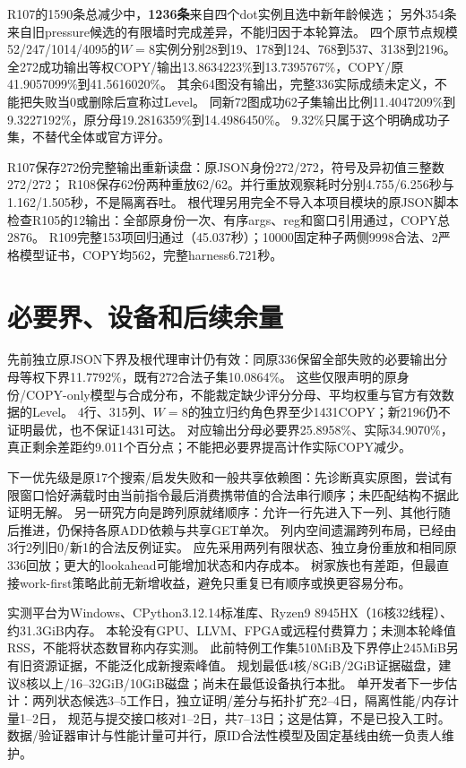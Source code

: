 \documentclass[UTF8,11pt,a4paper]{ctexart}
\begin{document}
R107的1590条总减少中，\textbf{1236条}来自四个dot实例且选中新年龄候选；
另外354条来自旧pressure候选的有限墙时完成差异，不能归因于本轮算法。
四个原节点规模52/247/1014/4095的$W=8$实例分别28到19、178到124、768到537、3138到2196。
全272成功输出等权COPY/输出13.8634223\%到13.7395767\%，COPY/原41.9057099\%到41.5616020\%。
其余64图没有输出，完整336实际成绩未定义，不能把失败当0或删除后宣称过Level。
同新72图成功62子集输出比例11.4047209\%到9.3227192\%，原分母19.2816359\%到14.4986450\%。
9.32\%只属于这个明确成功子集，不替代全体或官方评分。

R107保存272份完整输出重新读盘：原JSON身份272/272，符号及异初值三整数272/272；
R108保存62份两种重放62/62。并行重放观察耗时分别4.755/6.256秒与1.162/1.505秒，不是隔离吞吐。
根代理另用完全不导入本项目模块的原JSON脚本检查R105的12输出：全部原身份一次、有序args、reg和窗口引用通过，COPY总2876。
R109完整153项回归通过（45.037秒）；10000固定种子两侧9998合法、2严格模型证书，COPY均562，完整harness6.721秒。

\section{必要界、设备和后续余量}
先前独立原JSON下界及根代理审计仍有效：同原336保留全部失败的必要输出分母等权下界11.7792\%，既有272合法子集10.0864\%。
这些仅限声明的原身份/COPY-only模型与合成分布，不能裁定缺少评分分母、平均权重与官方有效数据的Level。
4行、315列、$W=8$的独立归约角色界至少1431COPY；新2196仍不证明最优，也不保证1431可达。
对应输出分母必要界25.8958\%、实际34.9070\%，真正剩余差距约9.011个百分点；不能把必要界提高计作实际COPY减少。

下一优先级是原17个搜索/启发失败和一般共享依赖图：先诊断真实原图，尝试有限窗口恰好满载时由当前指令最后消费携带值的合法串行顺序；未匹配结构不据此证明无解。
另一研究方向是跨列原就绪顺序：允许一行先进入下一列、其他行随后推进，仍保持各原ADD依赖与共享GET单次。
列内空间遗漏跨列布局，已经由3行2列旧0/新1的合法反例证实。
应先采用两列有限状态、独立身份重放和相同原336回放；更大的lookahead可能增加状态和内存成本。
树家族也有差距，但最直接work-first策略此前无新增收益，避免只重复已有顺序或换更容易分布。

实测平台为Windows、CPython3.12.14标准库、Ryzen9 8945HX（16核32线程）、约31.3GiB内存。
本轮没有GPU、LLVM、FPGA或远程付费算力；未测本轮峰值RSS，不能将状态数冒称内存实测。
此前特例工作集510MiB及下界停止245MiB另有旧资源证据，不能泛化成新搜索峰值。
规划最低4核/8GiB/2GiB证据磁盘，建议8核以上/16--32GiB/10GiB磁盘；尚未在最低设备执行本批。
单开发者下一步估计：两列状态候选3--5工作日，独立证明/差分与拓扑扩充2--4日，隔离性能/内存计量1--2日，
规范与提交接口核对1--2日，共7--13日；这是估算，不是已投入工时。
数据/验证器审计与性能计量可并行，原ID合法性模型及固定基线由统一负责人维护。
\end{document}
